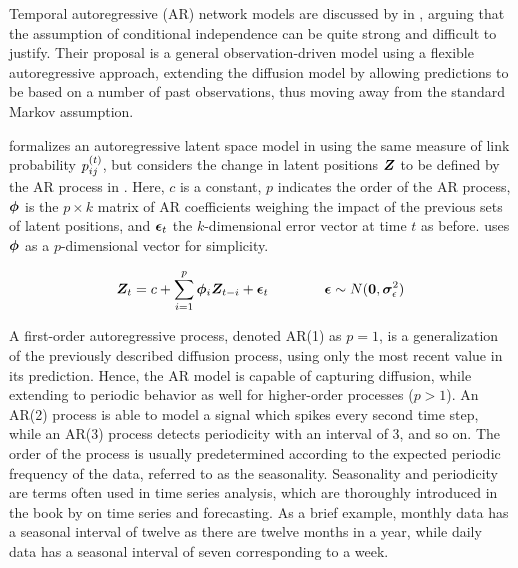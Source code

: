     Temporal autoregressive (AR) network models are discussed by \citeauthor{sewell2018simultaneous} in \cite{sewell2018simultaneous}, arguing that the assumption of conditional independence can be quite strong and difficult to justify. Their proposal is a general observation-driven model using a flexible autoregressive approach, extending the diffusion model by allowing predictions to be based on a number of past observations, thus moving away from the standard Markov assumption. 
    
    \citeauthor{zangenberg2018a} formalizes an autoregressive latent space model in \cite{zangenberg2018a} using the same measure of link probability $\sub(p)^\t$, but considers the change in latent positions $\bm{Z}$ to be defined by the AR process in . Here, $c$ is a constant, $p$ indicates the order of the AR process, $\bm{\phi}$ is the $p\times k$ matrix of AR coefficients weighing the impact of the previous sets of latent positions, and $\bm{\epsilon}_t$ the $k$-dimensional error vector at time $t$ as before. \citeauthor{zangenberg2018a} uses $\bm{\phi}$ as a $p$-dimensional vector for simplicity.
    
    \begin{equation}\label{eq:ar-model}
        \bm{Z}_t = c+\sum_{i=1}^p \bm{\phi}_i \bm{Z}_{t-i} + \bm{\epsilon}_t \qquad\qquad \bm{\epsilon} \sim N(\bm{0},\bm{\sigma}_\epsilon^2)
    \end{equation}
    
    A first-order autoregressive process, denoted AR(1) as $p=1$, is a generalization of the previously described diffusion process, using only the most recent value in its prediction. Hence, the AR model is capable of capturing diffusion, while extending to periodic behavior as well for higher-order processes ($p>1$). 
    An AR(2) process is able to model a signal which spikes every second time step, while an AR(3) process detects periodicity with an interval of 3, and so on. 
    The order of the process is usually predetermined according to the expected periodic frequency of the data, referred to as the seasonality.
    Seasonality and periodicity are terms often used in time series analysis, which are thoroughly introduced in the book \cite{brockwell2016introduction} by \citeauthor{brockwell2016introduction} on time series and forecasting.
    As a brief example, monthly data has a seasonal interval of twelve as there are twelve months in a year, while daily data has a seasonal interval of seven corresponding to a week.
    
